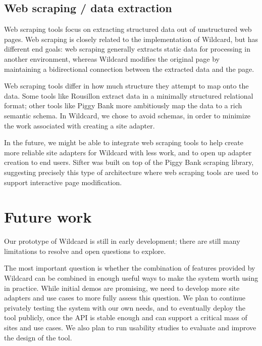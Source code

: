 \documentclass[english,submission]{programming}
\begin{document}
\hypertarget{web-scraping-data-extraction}{%
\subsection{Web scraping / data
extraction}\label{web-scraping-data-extraction}}

Web scraping tools focus on extracting structured data out of
unstructured web pages. Web scraping is closely related to the
implementation of Wildcard, but has different end goals: web scraping
generally extracts static data for processing in another environment,
whereas Wildcard modifies the original page by maintaining a
bidirectional connection between the extracted data and the page.

Web scraping tools differ in how much structure they attempt to map onto
the data. Some tools like Rousillon \autocite{chasins2018} extract data
in a minimally structured relational format; other tools like Piggy Bank
\autocite{huynh2005} more ambitiously map the data to a rich semantic
schema. In Wildcard, we chose to avoid schemas, in order to minimize the
work associated with creating a site adapter.

In the future, we might be able to integrate web scraping tools to help
create more reliable site adapters for Wildcard with less work, and to
open up adapter creation to end users. Sifter was built on top of the
Piggy Bank scraping library, suggesting precisely this type of
architecture where web scraping tools are used to support interactive
page modification.

\hypertarget{future-work}{%
\section{Future work}\label{future-work}}

Our prototype of Wildcard is still in early development; there are still
many limitations to resolve and open questions to explore.

The most important question is whether the combination of features
provided by Wildcard can be combined in enough useful ways to make the
system worth using in practice. While initial demos are promising, we
need to develop more site adapters and use cases to more fully assess
this question. We plan to continue privately testing the system with our
own needs, and to eventually deploy the tool publicly, once the API is
stable enough and can support a critical mass of sites and use cases. We
also plan to run usability studies to evaluate and improve the design of
the tool.
\end{document}
